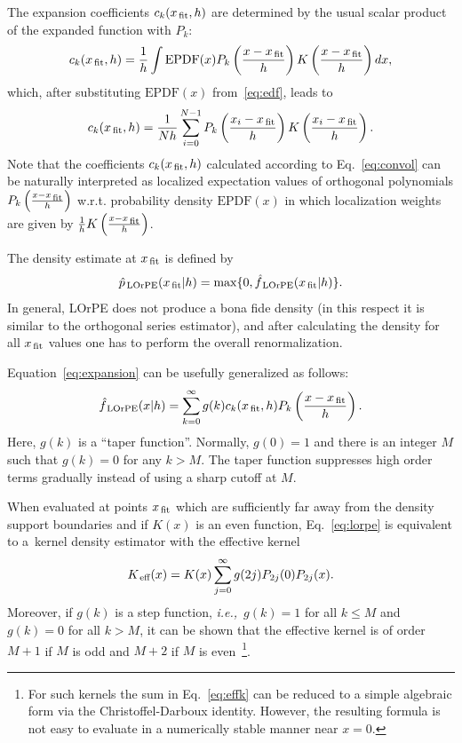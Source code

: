 \documentclass[12pt,titlepage]{article}
\newcommand{\sub}[1]{\ensuremath{_{\mbox{\scriptsize \,#1}}}}
\begin{document}
The expansion coefficients $c_{k}(x\sub{fit}, h)$
are determined by the usual scalar product of the expanded function with
$P_{k}$:
\begin{equation}\label{eq:convol}
c_{k}(x\sub{fit}, h) = \frac{1}{h} \int \mbox{EPDF}(x) P_{k}\left( \frac{x - x\sub{fit}}{h} \right)K\left( \frac{x - x\sub{fit}}{h} \right)dx,
\end{equation}
which, after substituting $\mbox{EPDF}(x)$ from~\ref{eq:edf}, leads to
\begin{equation}\label{eq:emp-ck}
c_{k}(x\sub{fit}, h) = \frac{1}{Nh}\sum_{i=0}^{N-1}P_{k}\left( \frac{x_i - x\sub{fit}}{h} \right) K\left( \frac{x_i - x\sub{fit}}{h} \right).
\end{equation}
Note that the coefficients $c_{k}(x\sub{fit}, h)$ calculated according to
Eq.~\ref{eq:convol} can be naturally 
interpreted as localized expectation values of orthogonal polynomials
$P_{k}\left( \frac{x - x\sub{fit}}{h} \right)$ w.r.t. probability
density $\mbox{EPDF}(x)$ in which localization weights are given by
$\frac{1}{h} K\left( \frac{x - x\sub{fit}}{h} \right)$.

The density estimate at $x\sub{fit}$ is defined by
\begin{equation}
\hat{p}\sub{LOrPE}(x\sub{fit}|h) = \max\{0, \hat{f}\sub{LOrPE}(x\sub{fit}|h)\}.
\label{eq:trunc}
\end{equation}
In general, LOrPE does not produce a bona fide density (in this respect it is similar to the
orthogonal series estimator), and after calculating
the density for all $x\sub{fit}$ values one has to perform the overall renormalization.

Equation~\ref{eq:expansion} can be usefully generalized as follows:
\begin{equation}\label{eq:lorpe}
\hat{f}\sub{LOrPE}(x|h) = \sum_{k=0}^{\infty} g(k) c_{k}(x\sub{fit}, h) P_{k}\left( \frac{x - x\sub{fit}}{h} \right).
\end{equation}
Here, $g(k)$ is a ``taper function''. Normally, $g(0) = 1$ and
there is an integer $M$ such that $g(k) = 0$ for any $k > M$. The
taper function suppresses
high order terms gradually instead of using a
sharp cutoff at $M$.

When evaluated at points $x\sub{fit}$
which are sufficiently far away from the density support
boundaries and if $K(x)$ is an even function, Eq.~\ref{eq:lorpe}
is equivalent to a~kernel density estimator with the effective
kernel
\begin{equation}\label{eq:effk}
K\sub{eff}(x) =  K(x) \sum_{j=0}^{\infty} g(2 j) P_{2 j}(0) P_{2 j}(x).
\end{equation}
Moreover, if $g(k)$ is a step function,
  {\it i.e.,}~$g(k) = 1$ for all $k \le M$ and $g(k) = 0$ for all $k > M$,
  it can be shown that the effective kernel is of order $M+1$ if $M$
  is odd and $M+2$ if $M$ is 
  even~\cite{ref:placida}\footnote{For such kernels the sum in Eq.~\ref{eq:effk}
  can be
  reduced to a simple algebraic form via the Christoffel-Darboux identity.
  However, the resulting formula is not easy to evaluate in a numerically
  stable manner near $x = 0$.}.
\end{document}
